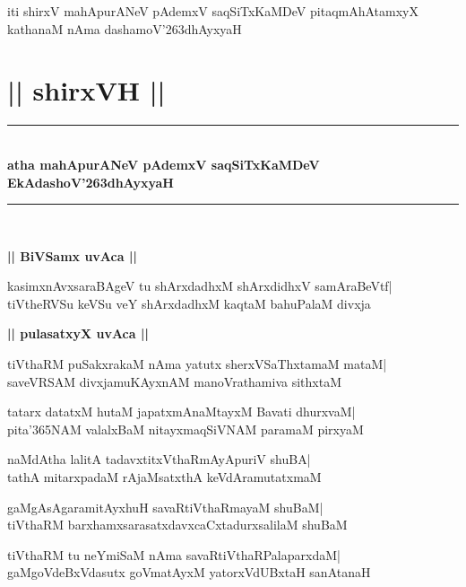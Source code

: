 \documentclass[twoside,12pt,openright]{book}
\def\S{\char'263}
\newcounter{shloka}[chapter]
\def\uvaca#1{\centerline{{\large\textbf{#1}}}}
\begin{document}
\begin{center}
 iti shirxV mahApurANeV pAdemxV saqSiTxKaMDeV pitaqmAhAtamxyX\\
 kathanaM nAma dashamoV\S dhAyxyaH
\end{center}

\chapter{|| shirxVH ||}
\begin{center}
\rule{2cm}{1pt}\\[0.5cm]
{\LARGE\bfseries atha mahApurANeV pAdemxV saqSiTxKaMDeV}\\[.3cm]
{\LARGE\bfseries EkAdashoV\S dhAyxyaH}\\[.3cm]
\rule{2cm}{1pt}\\
\end{center}

\uvaca{|| BiVSamx uvAca ||}
\begin{shloka}%
kasimxnAvxsaraBAgeV tu shArxdadhxM shArxdidhxV samAraBeVtf|\\
tiVtheRVSu keVSu veY shArxdadhxM kaqtaM bahuPalaM divxja
\end{shloka}

\uvaca{|| pulasatxyX uvAca ||}
\begin{shloka}%
tiVthaRM puSakxrakaM nAma yatutx sherxVSaThxtamaM mataM|\\
saveVRSAM divxjamuKAyxnAM manoVrathamiva sithxtaM
\end{shloka}

\begin{shloka}%
tatarx datatxM hutaM japatxmAnaMtayxM Bavati dhurxvaM|\\
pita\char'365NAM valalxBaM nitayxmaqSiVNAM paramaM pirxyaM
\end{shloka}

\begin{shloka}%
naMdAtha lalitA tadavxtitxVthaRmAyApuriV shuBA|\\
tathA mitarxpadaM rAjaMsatxthA keVdAramutatxmaM
\end{shloka}

\begin{shloka}%
gaMgAsAgaramitAyxhuH savaRtiVthaRmayaM shuBaM|\\
tiVthaRM barxhamxsarasatxdavxcaCxtadurxsalilaM shuBaM
\end{shloka}

\begin{shloka}%
tiVthaRM tu neYmiSaM nAma savaRtiVthaRPalaparxdaM|\\
gaMgoVdeBxVdasutx goVmatAyxM yatorxVdUBxtaH sanAtanaH
\end{shloka}
\end{document}
